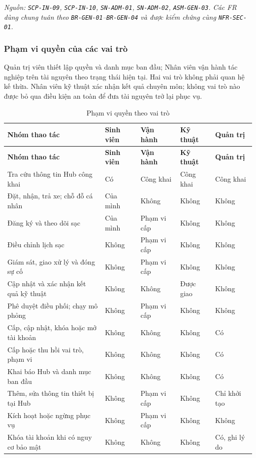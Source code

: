 \textit{Nguồn: \texttt{SCP-IN-09}, \texttt{SCP-IN-10}, \texttt{SN-ADM-01}, \texttt{SN-ADM-02}, \texttt{ASM-GEN-03}. Các FR dùng chung tuân theo \texttt{BR-GEN-01}--\texttt{BR-GEN-04} và được kiểm chứng cùng \texttt{NFR-SEC-01}.}


\clearpage
\subsubsection{Phạm vi quyền của các vai trò}

Quản trị viên thiết lập quyền và danh mục ban đầu; Nhân viên vận hành tác nghiệp trên tài nguyên theo trạng thái hiện tại. Hai vai trò không phải quan hệ kế thừa. Nhân viên kỹ thuật xác nhận kết quả chuyên môn; không vai trò nào được bỏ qua điều kiện an toàn để đưa tài nguyên trở lại phục vụ.

\begingroup
\small
\begin{longtable}{|L{48mm}|L{22mm}|L{22mm}|L{22mm}|L{22mm}|}
  \caption{Phạm vi quyền theo vai trò}\label{tab:role-permissions}\\
  \hline
  \textbf{Nhóm thao tác} & \textbf{Sinh viên} & \textbf{Vận hành} & \textbf{Kỹ thuật} & \textbf{Quản trị}\\\hline
  \endfirsthead
  \hline
  \textbf{Nhóm thao tác} & \textbf{Sinh viên} & \textbf{Vận hành} & \textbf{Kỹ thuật} & \textbf{Quản trị}\\\hline
  \endhead
  Tra cứu thông tin Hub công khai & Có & Công khai & Công khai & Công khai\\\hline
  Đặt, nhận, trả xe; chỗ đỗ cá nhân & Của mình & Không & Không & Không\\\hline
  Đăng ký và theo dõi sạc & Của mình & Phạm vi cấp & Không & Không\\\hline
  Điều chỉnh lịch sạc & Không & Phạm vi cấp & Không & Không\\\hline
  Giám sát, giao xử lý và đóng sự cố & Không & Phạm vi cấp & Không & Không\\\hline
  Cập nhật và xác nhận kết quả kỹ thuật & Không & Không & Được giao & Không\\\hline
  Phê duyệt điều phối; chạy mô phỏng & Không & Phạm vi cấp & Không & Không\\\hline
  Cấp, cập nhật, khóa hoặc mở tài khoản & Không & Không & Không & Có\\\hline
  Cấp hoặc thu hồi vai trò, phạm vi & Không & Không & Không & Có\\\hline
  Khai báo Hub và danh mục ban đầu & Không & Không & Không & Có\\\hline
  Thêm, sửa thông tin thiết bị tại Hub & Không & Phạm vi cấp & Không & Chỉ khởi tạo\\\hline
  Kích hoạt hoặc ngừng phục vụ & Không & Phạm vi cấp & Không & Không\\\hline
  Khóa tài khoản khi có nguy cơ bảo mật & Không & Không & Không & Có, ghi lý do\\\hline
\end{longtable}
\endgroup

